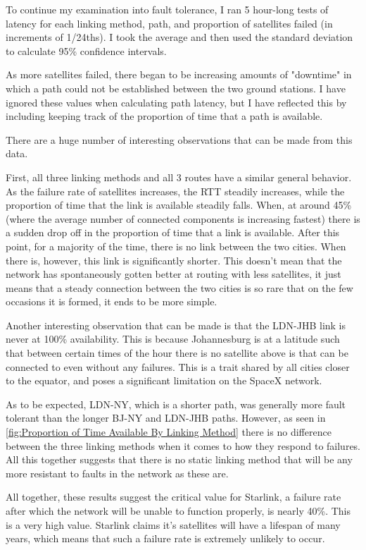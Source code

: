 \documentclass[12pt]{report}
\begin{document}
To continue my examination into fault tolerance, I ran 5 hour-long tests of latency for each linking method, path, and proportion of satellites failed (in increments of 1/24ths). I took the average and then used the standard deviation to calculate 95\% confidence intervals. 

As more satellites failed, there began to be increasing amounts of "downtime" in which a path could not be established between the two ground stations. I have ignored these values when calculating path latency, but I have reflected this by including keeping track of the proportion of time that a path is available.

There are a huge number of interesting observations that can be made from this data.

First, all three linking methods and all 3 routes have a similar general behavior. As the failure rate of satellites increases, the RTT steadily increases, while the proportion of time that the link is available steadily falls. When, at around 45\% (where the average number of connected components is increasing fastest) there is a sudden drop off in the proportion of time that a link is available. After this point, for a majority of the time, there is no link between the two cities. When there is, however, this link is significantly shorter. This doesn't mean that the network has spontaneously gotten better at routing with less satellites, it just means that a steady connection between the two cities is so rare that on the few occasions it is formed, it ends to be more simple.

Another interesting observation that can be made is that the LDN-JHB link is never at 100\% availability. This is because Johannesburg is at a latitude such that between certain times of the hour there is no satellite above is that can be connected to even without any failures. This is a trait shared by all cities closer to the equator, and poses a significant limitation on the SpaceX network.

As to be expected, LDN-NY, which is a shorter path, was generally more fault tolerant than the longer BJ-NY and LDN-JHB paths. However, as seen in \ref{fig:Proportion of Time Available By Linking Method} there is no difference between the three linking methods when it comes to how they respond to failures. All this together suggests that there is no static linking method that will be any more resistant to faults in the network as these are.

All together, these results suggest the critical value for Starlink, a failure rate after which the network will be unable to function properly, is nearly 40\%. This is a very high value. Starlink claims it's satellites will have a lifespan of many years, which means that such a failure rate is extremely unlikely to occur. 
\end{document}
